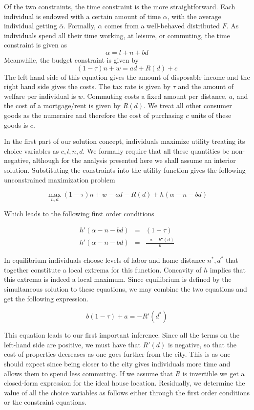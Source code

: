 \documentclass[11.0pt]{article}
\theoremstyle{definition}
\begin{document}
Of the two constraints, the time constraint is the more straightforward. Each individual is endowed with a certain amount of time $\alpha$, with the average individual getting $\bar{\alpha}$. Formally, $\alpha$ comes from a well-behaved distributed $F$. As individuals spend all their time working, at leisure, or commuting, the time constraint is given as
$$ \alpha = l + n + bd$$
Meanwhile, the budget constraint is given by
$$(1-\tau)n + w = ad + R(d) + c$$
The left hand side of this equation gives the amount of disposable income and the right hand side gives the costs. The tax rate is given by $\tau$ and the amount of welfare per individual is $w$. Commuting costs a fixed amount per distance, $a$, and the cost of a mortgage/rent is given by $R(d)$. We treat all other consumer goods as the numeraire and therefore the cost of purchasing $c$ units of these goods is $c$. 

In the first part of our solution concept, individuals maximize utility treating its choice variables as $c,l,n,d$. We formally require that all these quantities be non-negative, although for the analysis presented here we shall assume an interior solution. Substituting the constraints into the utility function gives the following unconstrained maximization problem

$$\max_{n,d}(1-\tau)n+w-ad - R(d) + h(\alpha-n-bd)$$

Which leads to the following first order conditions

\begin{eqnarray}
h'(\alpha-n-bd) &=& (1-\tau)\\
h'(\alpha-n-bd) &=& \frac{-a-R'(d)}{b} 
\end{eqnarray}

In equilibrium individuals choose levels of labor and home distance $n^*,d^*$ that together constitute a local extrema for this function. Concavity of $h$ implies that this extrema is indeed a local maximum. Since equilibrium is defined by the simultaneous solution to these equations, we may combine the two equations and get the following expression.

$$b(1-\tau) + a = -R'(d^*)$$

This equation leads to our first important inference.  Since all the terms on the left-hand side are positive, we must have that $R'(d)$ is negative, so that the cost of properties decreases as one goes further from the city.  This is as one should expect since being closer to the city gives individuals more time and allows them to spend less commuting.  If we assume that $R$ is invertible we get a closed-form expression for the ideal house location. Residually, we determine the value of all the choice variables as follows either through the first order conditions or the constraint equations.
\end{document}
